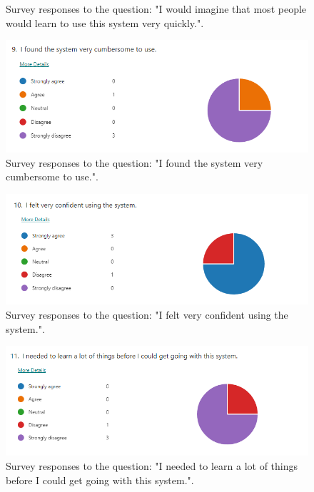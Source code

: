 \documentclass{l4proj}
\begin{document}
\begin{appendices}
\begin{figure}[h]
    \caption{Survey responses to the question: "I would imagine that most people would learn to use this system very quickly.".}
    \label{fig:usability7} 
\end{figure}

\begin{figure}[h]
    \centering
    \includegraphics[width=0.9\linewidth]{images/usability8.png}    

    \caption{Survey responses to the question: "I found the system very cumbersome to use.".}
    \label{fig:usability8} 
\end{figure}

\begin{figure}[h]
    \centering
    \includegraphics[width=0.9\linewidth]{images/usability9.png}    

    \caption{Survey responses to the question: "I felt very confident using the system.".}
    \label{fig:usability9} 
\end{figure}

\begin{figure}[h]
    \centering
    \includegraphics[width=0.9\linewidth]{images/usability10.png}    

    \caption{Survey responses to the question: "I needed to learn a lot of things before I could get going with this system.".}
    \label{fig:usability10} 
\end{figure}


\end{appendices}
\end{document}
